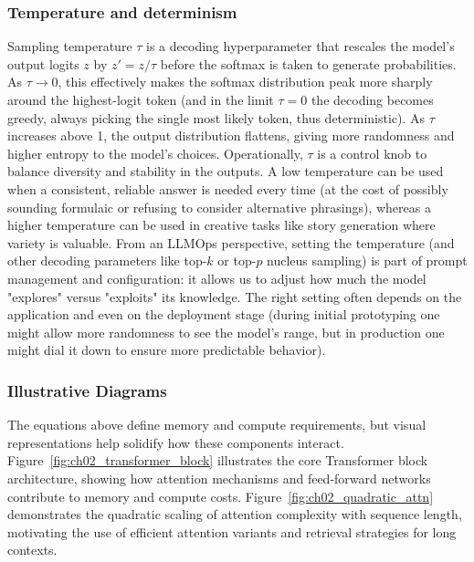 \subsubsection{Temperature and determinism}
Sampling temperature $\tau$ is a decoding hyperparameter that rescales the model's output logits $z$ by $z' = z/\tau$ before the softmax is taken to generate probabilities. As $\tau \to 0$, this effectively makes the softmax distribution peak more sharply around the highest-logit token (and in the limit $\tau=0$ the decoding becomes greedy, always picking the single most likely token, thus deterministic). As $\tau$ increases above 1, the output distribution flattens, giving more randomness and higher entropy to the model's choices. Operationally, $\tau$ is a control knob to balance diversity and stability in the outputs. A low temperature can be used when a consistent, reliable answer is needed every time (at the cost of possibly sounding formulaic or refusing to consider alternative phrasings), whereas a higher temperature can be used in creative tasks like story generation where variety is valuable. From an LLMOps perspective, setting the temperature (and other decoding parameters like top-$k$ or top-$p$ nucleus sampling) is part of prompt management and configuration: it allows us to adjust how much the model "explores" versus "exploits" its knowledge. The right setting often depends on the application and even on the deployment stage (during initial prototyping one might allow more randomness to see the model's range, but in production one might dial it down to ensure more predictable behavior).

\subsubsection{Illustrative Diagrams}
\label{sec:ch2-illustrative-diagrams}

The equations above define memory and compute requirements, but visual representations help solidify how these components interact. Figure~\ref{fig:ch02_transformer_block} illustrates the core Transformer block architecture, showing how attention mechanisms and feed-forward networks contribute to memory and compute costs. Figure~\ref{fig:ch02_quadratic_attn} demonstrates the quadratic scaling of attention complexity with sequence length, motivating the use of efficient attention variants and retrieval strategies for long contexts.

